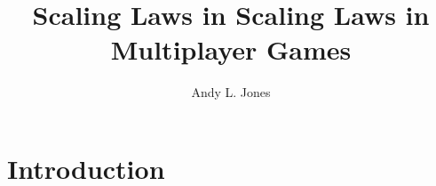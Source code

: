 \documentclass{article}
\title{Scaling Laws in Scaling Laws in Multiplayer Games}
\author{Andy L. Jones}
\begin{document}
\maketitle

\section{Introduction}
\end{document}
